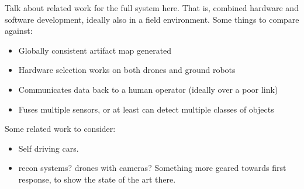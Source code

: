 Talk about related work for the full system here. That is, combined hardware and software development, ideally also in a field environment. Some things to compare against:

\begin{itemize}
	\item Globally consistent artifact map generated
	\item Hardware selection works on both drones and ground robots
	\item Communicates data back to a human operator (ideally over a poor link)
	\item Fuses multiple sensors, or at least can detect multiple classes of objects
\end{itemize}

Some related work to consider:

\begin{itemize}
	\item Self driving cars.
	\item recon systems? drones with cameras? Something more geared towards first response, to show the state of the art there.
\end{itemize}